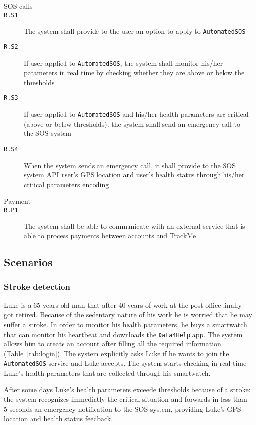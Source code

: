 \begin{description}
      \item[SOS calls]
      \item[\texttt{R.S1}] The system shall provide to the user an option to apply to \texttt{AutomatedSOS}
      \item[\texttt{R.S2}] If user applied to \texttt{AutomatedSOS}, the system shall monitor his/her parameters in real time by checking whether they are above or below the thresholds
      \item[\texttt{R.S3}] If user applied to \texttt{AutomatedSOS} and his/her health parameters are critical (above or below thresholds), the system shall send an emergency call to the SOS system
      \item[\texttt{R.S4}] When the system sends an emergency call, it shall provide to the SOS system API user's GPS location and user's health status through his/her critical parameters encoding

      \item[Payment]
      \item[\texttt{R.P1}] The system shall be able to communicate with an external service that is able to process payments between accounts and TrackMe

    \end{description}

  \subsection{Scenarios}

    \subsubsection{Stroke detection}

      Luke is a 65 years old man that after 40 years of work at the post office finally got retired. Because of the sedentary nature of his work he is worried that he may suffer a stroke. In order to monitor his health parameters, he buys a smartwatch that can monitor his heartbeat and downloads the \texttt{Data4Help} app. The system allows him to create an account after filling all the required information (Table~\ref{tab:login}). The system explicitly asks Luke if he wants to join the \texttt{AutomatedSOS} service and Luke accepts. The system starts checking in real time Luke's health parameters that are collected through his smartwatch.

      After some days Luke's health parameters exceede thresholds because of a stroke: the system recognizes immediatly the critical situation and forwards in less than 5 seconds an emergency notification to the SOS system, providing Luke's GPS location and health status feedback.

